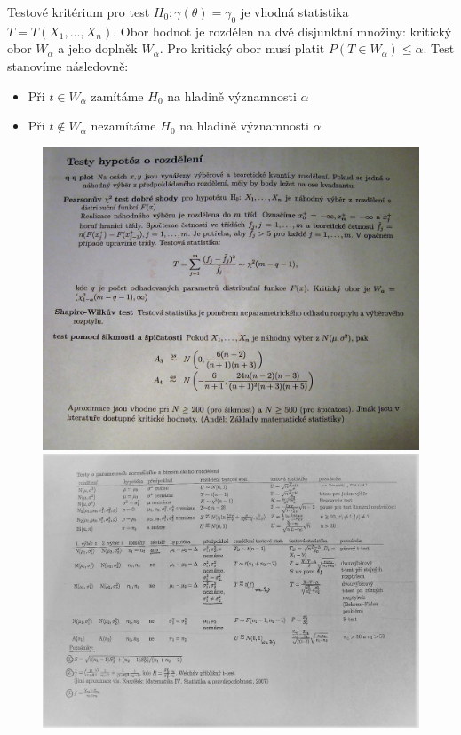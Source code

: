 \begin{notes}
Testové kritérium pro test $H_0 : \gamma \left(\theta \right) = \gamma_0$ je vhodná statistika $T=T \left(X_1,\ldots,X_n \right)$. Obor hodnot je rozdělen na dvě disjunktní množiny: kritický obor $W_{\alpha}$ a jeho doplněk $\bar{W}_{\alpha}$. Pro kritický obor musí platit $P \left(T \in W_{\alpha} \right) \leq \alpha$. Test stanovíme následovně: \begin{itemize}
\item Při $t \in W_{\alpha}$ zamítáme $H_0$ na hladině významnosti $\alpha$
\item Při $t \notin W_{\alpha}$ nezamítáme $H_0$ na hladině významnosti $\alpha$
\end{itemize}
\end{notes}

\begin{figure}[H]
\includegraphics[scale=1]{Obrazky/stat4.png}
\includegraphics[scale=1]{Obrazky/stat2.png}
\end{figure}

